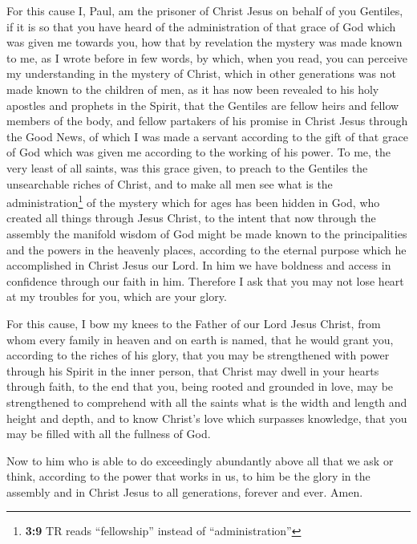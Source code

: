  For this cause I, Paul, am the prisoner of Christ Jesus
on behalf of you Gentiles,  if it is so that you have
heard of the administration of that grace of God which was given me
towards you,  how that by revelation the mystery was made
known to me, as I wrote before in few words,  by which,
when you read, you can perceive my understanding in the mystery of
Christ,  which in other generations was not made known to
the children of men, as it has now been revealed to his holy apostles
and prophets in the Spirit,  that the Gentiles are fellow
heirs and fellow members of the body, and fellow partakers of his
promise in Christ Jesus through the Good News,  of which I
was made a servant according to the gift of that grace of God which was
given me according to the working of his power.  To me,
the very least of all saints, was this grace given, to preach to the
Gentiles the unsearchable riches of Christ,  and to make
all men see what is the administration\footnote{\textbf{3:9} TR reads
  ``fellowship'' instead of ``administration''} of the mystery which for
ages has been hidden in God, who created all things through Jesus
Christ,  to the intent that now through the assembly the
manifold wisdom of God might be made known to the principalities and the
powers in the heavenly places,  according to the eternal
purpose which he accomplished in Christ Jesus our Lord. 
In him we have boldness and access in confidence through our faith in
him.  Therefore I ask that you may not lose heart at my
troubles for you, which are your glory.

 For this cause, I bow my knees to the Father of our Lord
Jesus Christ,  from whom every family in heaven and on
earth is named,  that he would grant you, according to
the riches of his glory, that you may be strengthened with power through
his Spirit in the inner person,  that Christ may dwell in
your hearts through faith, to the end that you, being rooted and
grounded in love,  may be strengthened to comprehend with
all the saints what is the width and length and height and depth,
 and to know Christ's love which surpasses knowledge,
that you may be filled with all the fullness of God.

 Now to him who is able to do exceedingly abundantly
above all that we ask or think, according to the power that works in us,
 to him be the glory in the assembly and in Christ Jesus
to all generations, forever and ever. Amen.

